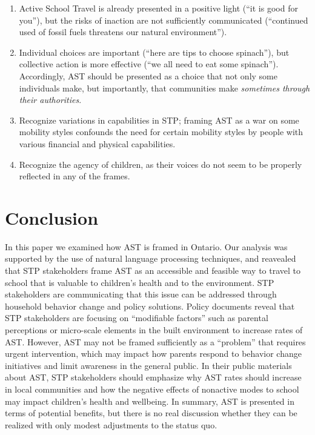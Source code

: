\documentclass[preprint, 3p,
authoryear]{elsarticle} %
\providecommand{\tightlist}{%
  \setlength{\itemsep}{0pt}\setlength{\parskip}{0pt}}
\begin{document}
\begin{enumerate}
\def\labelenumi{\arabic{enumi}.}
\tightlist
\item
  Active School Travel is already presented in a positive light (``it is
  good for you''), but the risks of inaction are not sufficiently
  communicated (``continued used of fossil fuels threatens our natural
  environment'').
\item
  Individual choices are important (``here are tips to choose
  spinach''), but collective action is more effective (``we all need to
  eat some spinach''). Accordingly, AST should be presented as a choice
  that not only some individuals make, but importantly, that communities
  make \emph{sometimes through their authorities}.
\item
  Recognize variations in capabilities in STP; framing AST as a war on
  some mobility styles confounds the need for certain mobility styles by
  people with various financial and physical capabilities.
\item
  Recognize the agency of children, as their voices do not seem to be
  properly reflected in any of the frames.
\end{enumerate}

\hypertarget{conclusion}{%
\section{Conclusion}\label{conclusion}}

In this paper we examined how AST is framed in Ontario. Our analysis was
supported by the use of natural language processing techniques, and
reavealed that STP stakeholders frame AST as an accessible and feasible
way to travel to school that is valuable to children's health and to the
environment. STP stakeholders are communicating that this issue can be
addressed through household behavior change and policy solutions. Policy
documents reveal that STP stakeholders are focusing on ``modifiable
factors'' such as parental perceptions or micro-scale elements in the
built environment to increase rates of AST. However, AST may not be
framed sufficiently as a ``problem'' that requires urgent intervention,
which may impact how parents respond to behavior change initiatives and
limit awareness in the general public. In their public materials about
AST, STP stakeholders should emphasize why AST rates should increase in
local communities and how the negative effects of nonactive modes to
school may impact children's health and wellbeing. In summary, AST is
presented in terms of potential benefits, but there is no real
discussion whether they can be realized with only modest adjustments to
the status quo.
\end{document}
